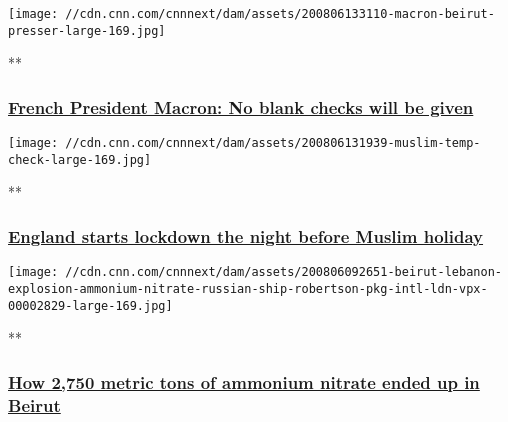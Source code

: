 \href{/videos/world/2020/08/06/emmanuel-macron-lebanon-leaders-blank-check-sot-vpx.afptv/video/playlists/around-the-world/}{}

\texttt{[image: //cdn.cnn.com/cnnnext/dam/assets/200806133110-macron-beirut-presser-large-169.jpg]}

**

\hypertarget{french-president-macron-no-blank-checks-will-be-given}{%
\subsubsection{\texorpdfstring{\href{/videos/world/2020/08/06/emmanuel-macron-lebanon-leaders-blank-check-sot-vpx.afptv/video/playlists/around-the-world/}{French
President Macron: No blank checks will be
given}}{French President Macron: No blank checks will be given}}\label{french-president-macron-no-blank-checks-will-be-given}}

\href{/videos/world/2020/08/06/england-lockdown-on-eid-eve-muslims-veselinovic-vpx.cnn/video/playlists/around-the-world/}{}

\texttt{[image: //cdn.cnn.com/cnnnext/dam/assets/200806131939-muslim-temp-check-large-169.jpg]}

**

\hypertarget{england-starts-lockdown-the-night-before-muslim-holiday}{%
\subsubsection{\texorpdfstring{\href{/videos/world/2020/08/06/england-lockdown-on-eid-eve-muslims-veselinovic-vpx.cnn/video/playlists/around-the-world/}{England
starts lockdown the night before Muslim
holiday}}{England starts lockdown the night before Muslim holiday}}\label{england-starts-lockdown-the-night-before-muslim-holiday}}

\href{/videos/world/2020/08/06/beirut-lebanon-explosion-ammonium-nitrate-russian-ship-robertson-pkg-intl-ldn-vpx.cnn/video/playlists/around-the-world/}{}

\texttt{[image: //cdn.cnn.com/cnnnext/dam/assets/200806092651-beirut-lebanon-explosion-ammonium-nitrate-russian-ship-robertson-pkg-intl-ldn-vpx-00002829-large-169.jpg]}

**

\hypertarget{how-2750-metric-tons-of-ammonium-nitrate-ended-up-in-beirut}{%
\subsubsection{\texorpdfstring{\href{/videos/world/2020/08/06/beirut-lebanon-explosion-ammonium-nitrate-russian-ship-robertson-pkg-intl-ldn-vpx.cnn/video/playlists/around-the-world/}{How
2,750 metric tons of ammonium nitrate ended up in
Beirut}}{How 2,750 metric tons of ammonium nitrate ended up in Beirut}}\label{how-2750-metric-tons-of-ammonium-nitrate-ended-up-in-beirut}}

